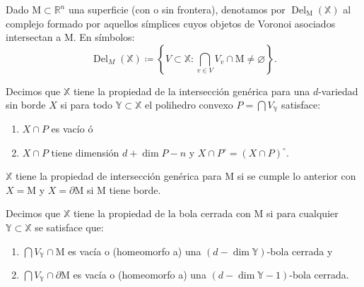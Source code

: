 \documentclass[legalpaper,12pt]{article}
\newcommand{\X}{\mathbb{X}}
\newcommand{\Y}{\mathbb{Y}}
\newcommand{\R}{\mathbb{R}}
\newcommand{\MM}{\mathrm{M}}
\DeclareMathOperator{\Del}{Del}
\begin{document}
Dado \(\MM \subset \R^n\) una superficie (con o sin frontera), denotamos
por \(\Del_{\MM}(\X)\) al complejo formado por aquellos símplices cuyos objetos
de Voronoi asociados intersectan a \(\MM\). En símbolos:
\begin{displaymath}
  \Del_M(\X)
  \coloneqq
  \left\{ 
    V \subset \X \colon
    \bigcap_{v\in V} V_{v} \cap \MM \ne \varnothing
  \right\}.
\end{displaymath}

Decimos que \(\X\) tiene la propiedad de la intersección genérica para
una \(d\)-variedad sin borde \(X\)
si para todo \(\Y \subset \X\) el polihedro convexo \(P = \bigcap V_{\Y}\) 
satisface:
\begin{enumerate}
  \item \(X \cap P\) es vacío ó
  \item \(X \cap P\) tiene dimensión \(d+\dim P-n\) y \(X \cap P^{\circ} = (X\cap P)^{\circ}\). 
\end{enumerate}
\(\X\) tiene la propiedad de intersección genérica para \(\MM\)  
si se cumple lo anterior con \(X=\MM\) y \(X=\partial \MM\) si \(\MM\) tiene borde.   

Decimos que \(\X\) tiene la propiedad de la bola cerrada con \(\MM\) si
para cualquier \(\Y\subset\X\) se satisface que:
\begin{enumerate}
  \item \(\bigcap V_{\Y} \cap \MM\) es vacía o (homeomorfo a) una \((d-\dim\Y)\)-bola cerrada y
  \item \(\bigcap V_{\Y} \cap \partial\MM\) es vacía o (homeomorfo a) una \((d-\dim\Y - 1)\)-bola cerrada.
\end{enumerate}
\end{document}
